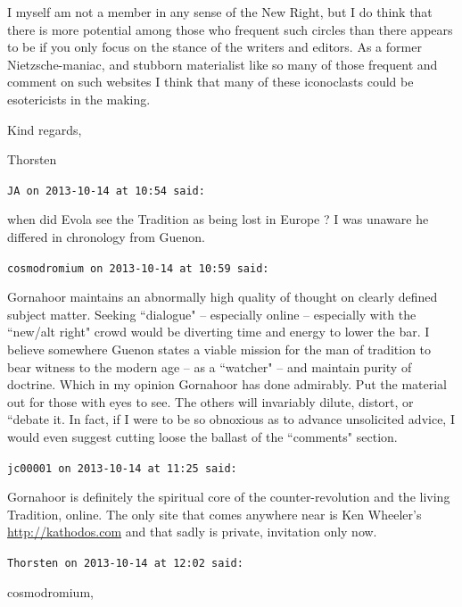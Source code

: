 \begin{footnotesize}
\begin{sffamily}
I myself am not a member in any sense of the New Right, but I do think that there is more potential among those who
frequent such circles than there appears to be if you only focus on the stance of the writers and editors. As a former
Nietzsche-maniac, and stubborn materialist like so many of those frequent and comment on such websites I think that
many of these iconoclasts could be esotericists in the making.

Kind regards,

Thorsten


\hfill

\texttt{JA on 2013-10-14 at 10:54 said: }

when did Evola see the Tradition as being lost in Europe ? I was unaware he differed in chronology from Guenon.


\hfill

\texttt{cosmodromium on 2013-10-14 at 10:59 said: }

Gornahoor maintains an abnormally high quality of thought on clearly defined subject matter. Seeking ``dialogue" –
especially online – especially with the ``new/alt right" crowd would be diverting time and energy to lower the bar. I
believe somewhere Guenon states a viable mission for the man of tradition to bear witness to the modern age – as a
``watcher" – and maintain purity of doctrine. Which in my opinion Gornahoor has done admirably. Put the material out for
those with eyes to see. The others will invariably dilute, distort, or ``debate it. In fact, if I were to be so
obnoxious as to advance unsolicited advice, I would even suggest cutting loose the ballast of the ``comments" section.


\hfill

\texttt{jc00001 on 2013-10-14 at 11:25 said: }

Gornahoor is definitely the spiritual core of the counter-revolution and the living Tradition, online. The only site
that comes anywhere near is Ken Wheeler's \url{http://kathodos.com} and that sadly is private,
invitation only now.


\hfill

\texttt{Thorsten on 2013-10-14 at 12:02 said: }

cosmodromium,


\end{sffamily}
\end{footnotesize}
